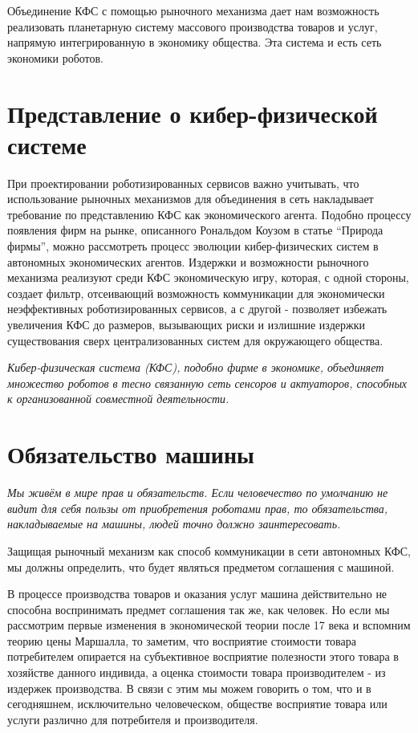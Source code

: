 \documentclass{article}
\begin{document}
Объединение КФС с помощью рыночного механизма дает нам возможность реализовать планетарную систему массового производства товаров и услуг, напрямую интегрированную в экономику общества. Эта система и есть сеть экономики роботов.

\section{Представление о кибер-физической системе}

При проектировании роботизированных сервисов важно учитывать, что использование рыночных механизмов для объединения в сеть накладывает требование по представлению КФС как экономического агента. Подобно процессу появления фирм на рынке, описанного Рональдом Коузом в статье “Природа фирмы”, можно рассмотреть процесс эволюции кибер-физических систем в автономных экономических агентов. Издержки и возможности рыночного механизма реализуют среди КФС экономическую игру, которая, с одной стороны, создает фильтр, отсеивающий возможность коммуникации для экономически неэффективных роботизированных сервисов, а с другой - позволяет избежать увеличения КФС до размеров, вызывающих риски и излишние издержки существования сверх централизованных систем для окружающего общества. 

\textit{Кибер-физическая система (КФС), подобно фирме в экономике, объединяет множество роботов в тесно связанную сеть сенсоров и актуаторов, способных к организованной совместной деятельности.}

\section{Обязательство машины}

\textit{Мы живём в мире прав и обязательств. Если человечество по умолчанию не видит для себя пользы от приобретения роботами прав, то обязательства, накладываемые на машины, людей точно должно заинтересовать.}

Защищая рыночный механизм как способ коммуникации в сети автономных КФС, мы должны определить, что будет являться предметом соглашения с машиной. 

В процессе производства товаров и оказания услуг машина действительно не способна воспринимать предмет соглашения так же, как человек. Но если мы рассмотрим первые изменения в экономической теории после 17 века и вспомним теорию цены Маршалла, то заметим, что восприятие стоимости товара потребителем опирается на субъективное восприятие полезности этого товара в хозяйстве данного индивида, а оценка стоимости товара производителем - из издержек производства. В связи с этим мы можем говорить о том, что и в сегодняшнем, исключительно человеческом, обществе восприятие товара или услуги различно для потребителя и производителя.
\end{document}

